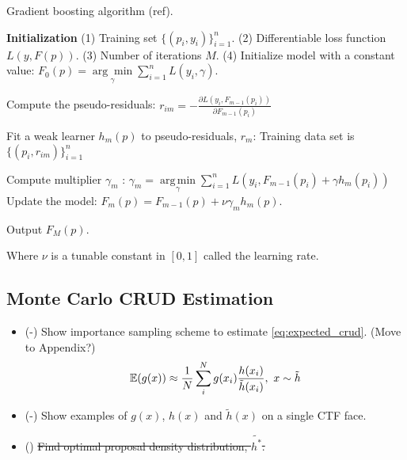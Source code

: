 \begin{algorithm}[H]
    \caption{Gradient boosting algorithm (ref).}
    \begin{algorithmic}
    \STATE \textbf{Initialization} 
    \STATE (1) Training set $\{(p_i, y_i)\}_{i=1}^n$. 
    \STATE (2) Differentiable loss function $L(y, F(p))$. 
    \STATE (3) Number of iterations ${{M}}$.
    \STATE (4)   Initialize model with a constant value:
        $F_0(p) = \underset{\gamma}{\arg\min} \sum_{i=1}^n L(y_i, \gamma).$
    
        \STATE Compute the pseudo-residuals:  
            \STATE $r_{im} = -\frac{\partial L(y_i, F_{m-1}(p_i))}{\partial F_{m-1}(p_i)}$
        \ENDFOR
        
        \STATE Fit a weak learner $h_m(p)$ to pseudo-residuals, $r_{m}$: Training data set is $\{(p_i, r_{im})\}_{i=1}^n$ \;
        
        \STATE Compute multiplier $\gamma_m$ :
        $\gamma_m = \underset{\gamma}{\operatorname{arg\,min}} \sum_{i=1}^n L\left(y_i, F_{m-1}(p_i) + \gamma h_m(p_i)\right)$\;
        \STATE Update the model:
        $F_m(p) = F_{m-1}(p) + \nu \gamma_m h_m(p).$
    
    \ENDFOR
    \STATE Output $F_M(p).$
    \end{algorithmic}
\end{algorithm}
Where $\nu$ is a tunable constant in $[0, 1]$ called the learning rate.


\subsection{Monte Carlo CRUD Estimation}

\begin{itemize}
        \item (\checkmark-) Show importance sampling scheme to estimate \ref{eq:expected_crud}.  (Move to Appendix?)
        \begin{equation}
        \operatorname*{\mathbb{E}}(g(x)) \approx \frac{1}{N} \sum_i^N g(x_i) \frac{h(x_i)}{\tilde h(x_i)}, \ x \sim \tilde{h}
        \end{equation}
        \item (\checkmark-) Show examples of $g(x)$, $h(x)$ and $\tilde h(x)$ on a single CTF face.
        \item (\xmark) \sout{Find optimal proposal density distribution, $\tilde{h^*}$.}
\end{itemize}



